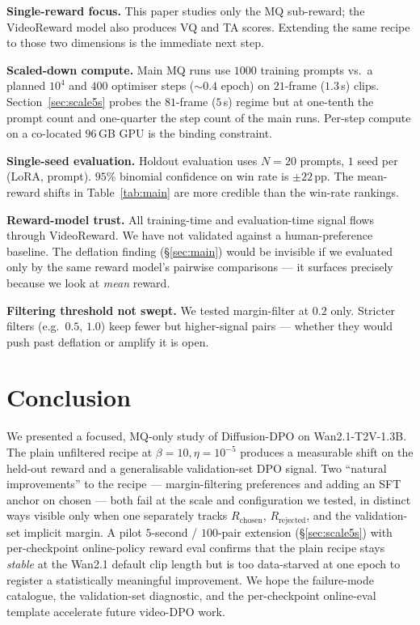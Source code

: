 \documentclass{article}
\begin{document}
\textbf{Single-reward focus.}  This paper studies only the MQ sub-reward; the VideoReward model also produces VQ and TA scores.  Extending the same recipe to those two dimensions is the immediate next step.

\textbf{Scaled-down compute.}  Main MQ runs use $1000$ training prompts vs.\ a planned $10^4$ and $400$ optimiser steps ($\sim 0.4$ epoch) on $21$-frame ($1.3$\,s) clips.  Section~\ref{sec:scale5s} probes the $81$-frame ($5$\,s) regime but at one-tenth the prompt count and one-quarter the step count of the main runs.  Per-step compute on a co-located $96$\,GB GPU is the binding constraint.

\textbf{Single-seed evaluation.}  Holdout evaluation uses $N{=}20$ prompts, $1$ seed per (LoRA, prompt).  $95\%$ binomial confidence on win rate is $\pm 22$\,pp.  The mean-reward shifts in Table~\ref{tab:main} are more credible than the win-rate rankings.

\textbf{Reward-model trust.}  All training-time and evaluation-time signal flows through VideoReward.  We have not validated against a human-preference baseline.  The deflation finding (\S\ref{sec:main}) would be invisible if we evaluated only by the same reward model's pairwise comparisons --- it surfaces precisely because we look at \emph{mean} reward.

\textbf{Filtering threshold not swept.}  We tested margin-filter at $0.2$ only.  Stricter filters (e.g.\ $0.5$, $1.0$) keep fewer but higher-signal pairs --- whether they would push past deflation or amplify it is open.

\section{Conclusion}
We presented a focused, MQ-only study of Diffusion-DPO on Wan2.1-T2V-1.3B.  The plain unfiltered recipe at $\beta{=}10, \eta{=}10^{-5}$ produces a measurable shift on the held-out reward and a generalisable validation-set DPO signal.  Two ``natural improvements'' to the recipe --- margin-filtering preferences and adding an SFT anchor on chosen --- both fail at the scale and configuration we tested, in distinct ways visible only when one separately tracks $R_{\text{chosen}}$, $R_{\text{rejected}}$, and the validation-set implicit margin.  A pilot $5$-second / $100$-pair extension (\S\ref{sec:scale5s}) with per-checkpoint online-policy reward eval confirms that the plain recipe stays \emph{stable} at the Wan2.1 default clip length but is too data-starved at one epoch to register a statistically meaningful improvement.  We hope the failure-mode catalogue, the validation-set diagnostic, and the per-checkpoint online-eval template accelerate future video-DPO work.
\end{document}

